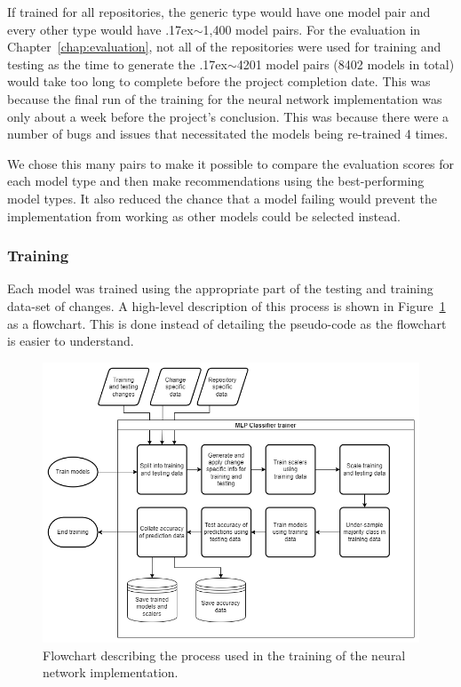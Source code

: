 \label{para:neural-network-length-of-training-considerations}If trained for all repositories, the generic type would have one model pair and every other type would have {\raise.17ex\hbox{$\scriptstyle\sim$}}1,400 model pairs. For the evaluation in Chapter~\ref{chap:evaluation}, not all of the repositories were used for training and testing as the time to generate the {\raise.17ex\hbox{$\scriptstyle\sim$}}4201 model pairs (8402 models in total) would take too long to complete before the project completion date. This was because the final run of the training for the neural network implementation was only about a week before the project's conclusion. This was because there were a number of bugs and issues that necessitated the models being re-trained 4 times.

We chose this many pairs to make it possible to compare the evaluation scores for each model type and then make recommendations using the best-performing model types. It also reduced the chance that a model failing would prevent the implementation from working as other models could be selected instead.

\hspace{0.25cm}
\subsubsection{Training\label{section:rule-based-implementation-training}}

Each model was trained using the appropriate part of the testing and training data-set of changes. A high-level description of this process is shown in Figure~\ref{fig:neural-network-training-flowchart} as a flowchart. This is done instead of detailing the pseudo-code as the flowchart is easier to understand.

\begin{figure}[h]
    \centering
    \includegraphics[scale=0.5]{images/neural-network-trainer-seperate.png}
    \caption{Flowchart describing the process used in the training of the neural network implementation.}
    \label{fig:neural-network-training-flowchart}
\end{figure}

